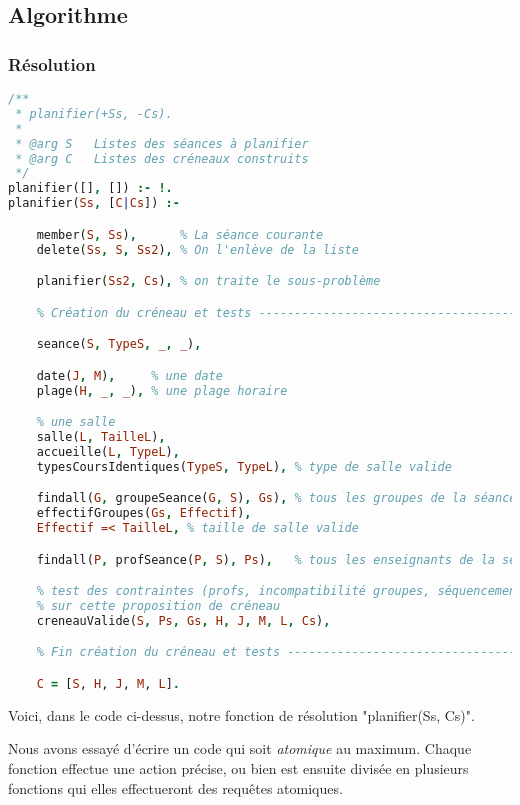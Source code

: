 
\subsection{Algorithme}

\subsubsection{Résolution}

\begin{lstlisting}[language=Prolog, caption=Resolution, captionpos=b]
/**
 * planifier(+Ss, -Cs).
 *
 * @arg S   Listes des séances à planifier
 * @arg C   Listes des créneaux construits
 */
planifier([], []) :- !.
planifier(Ss, [C|Cs]) :-

    member(S, Ss),      % La séance courante
    delete(Ss, S, Ss2), % On l'enlève de la liste

    planifier(Ss2, Cs), % on traite le sous-problème

    % Création du créneau et tests ---------------------------------------------

    seance(S, TypeS, _, _),

    date(J, M),     % une date
    plage(H, _, _), % une plage horaire

    % une salle
    salle(L, TailleL),
    accueille(L, TypeL),
    typesCoursIdentiques(TypeS, TypeL), % type de salle valide

    findall(G, groupeSeance(G, S), Gs), % tous les groupes de la séance
    effectifGroupes(Gs, Effectif),
    Effectif =< TailleL, % taille de salle valide

    findall(P, profSeance(P, S), Ps),   % tous les enseignants de la séance

    % test des contraintes (profs, incompatibilité groupes, séquencement)
    % sur cette proposition de créneau
    creneauValide(S, Ps, Gs, H, J, M, L, Cs),

    % Fin création du créneau et tests -----------------------------------------

    C = [S, H, J, M, L].
\end{lstlisting}

Voici, dans le code ci-dessus, notre fonction de résolution "planifier(Ss, Cs)". 

Nous avons essayé d'écrire un code qui soit \emph{atomique} au maximum. Chaque fonction effectue une action précise, ou bien est ensuite divisée en plusieurs fonctions qui elles effectueront des requêtes atomiques.

